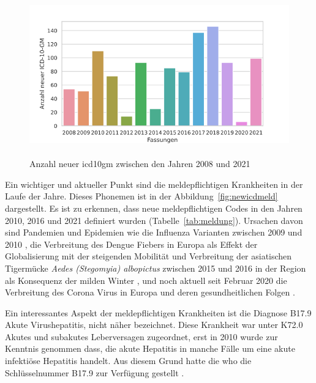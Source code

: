 
\begin{figure}[ht]
	\centering
	\includegraphics[height=7cm]{figures/newicdyear}
	\caption[Neue \acs{icd10gm} pro Jahr]{Anzahl neuer \acs{icd10gm} zwischen den Jahren 2008 und 2021}
	\label{fig:newicdyear}
\end{figure} 

Ein wichtiger und aktueller Punkt sind die meldepflichtigen Krankheiten in der Laufe der Jahre. Dieses Phonemen ist in der Abbildung~\ref{fig:newicdmeld} dargestellt. Es ist zu erkennen, dass neue meldepflichtigen Codes in den Jahren 2010, 2016 und 2021 definiert wurden (Tabelle~\ref{tab:meldung}). Ursachen davon sind Pandemien und Epidemien wie die Influenza Varianten zwischen 2009 und 2010 \cite{influenza1, influenza2}, die Verbreitung des Dengue Fiebers in Europa als Effekt der Globalisierung mit der steigenden Mobilität \cite{denge1} und Verbreitung der asiatischen Tigermücke \textsl{Aedes (Stegomyia) albopictus} zwischen 2015 und 2016 in der Region als Konsequenz der milden Winter \cite{denge2}, und noch aktuell seit Februar 2020 die Verbreitung des Corona Virus in Europa \cite{corona1} und deren gesundheitlichen Folgen \cite{corona2}. 

Ein interessantes Aspekt der meldepflichtigen Krankheiten ist die Diagnose \textsf{B17.9} \textsf{Akute Virushepatitis, nicht näher bezeichnet}. Diese Krankheit war unter \textsf{K72.0} \textsf{Akutes und subakutes Leberversagen} zugeordnet, erst in 2010 wurde zur Kenntnis genommen dass, die akute Hepatitis in manche Fälle um eine akute infektiöse Hepatitis handelt. Aus diesem Grund hatte die \ac{who} die Schlüsselnummer \textsf{B17.9} zur Verfügung gestellt \cite{komm10}.



\clearpage

